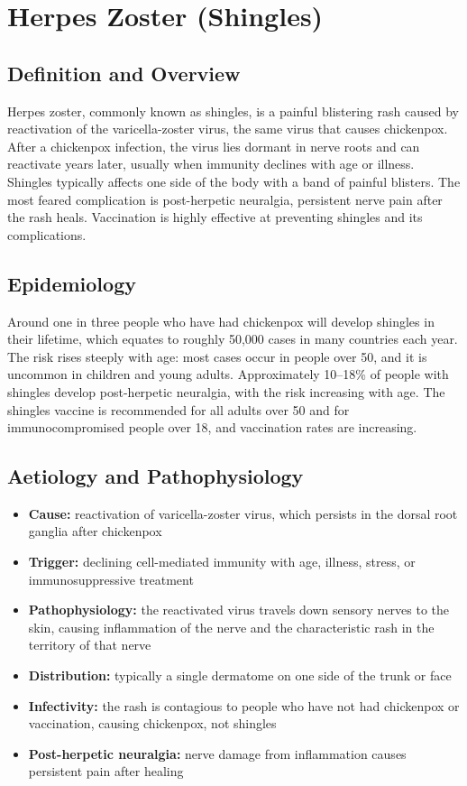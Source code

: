 \chapter{Herpes Zoster (Shingles)}

\section*{Definition and Overview}
Herpes zoster, commonly known as shingles, is a painful blistering rash caused by reactivation of the varicella-zoster virus, the same virus that causes chickenpox. After a chickenpox infection, the virus lies dormant in nerve roots and can reactivate years later, usually when immunity declines with age or illness. Shingles typically affects one side of the body with a band of painful blisters. The most feared complication is post-herpetic neuralgia, persistent nerve pain after the rash heals. Vaccination is highly effective at preventing shingles and its complications.

\section*{Epidemiology}
Around one in three people who have had chickenpox will develop shingles in their lifetime, which equates to roughly 50,000 cases in many countries each year. The risk rises steeply with age: most cases occur in people over 50, and it is uncommon in children and young adults. Approximately 10--18\% of people with shingles develop post-herpetic neuralgia, with the risk increasing with age. The shingles vaccine is recommended for all adults over 50 and for immunocompromised people over 18, and vaccination rates are increasing.

\section*{Aetiology and Pathophysiology}
\begin{itemize}
    \item \textbf{Cause:} reactivation of varicella-zoster virus, which persists in the dorsal root ganglia after chickenpox
    \item \textbf{Trigger:} declining cell-mediated immunity with age, illness, stress, or immunosuppressive treatment
    \item \textbf{Pathophysiology:} the reactivated virus travels down sensory nerves to the skin, causing inflammation of the nerve and the characteristic rash in the territory of that nerve
    \item \textbf{Distribution:} typically a single dermatome on one side of the trunk or face
    \item \textbf{Infectivity:} the rash is contagious to people who have not had chickenpox or vaccination, causing chickenpox, not shingles
    \item \textbf{Post-herpetic neuralgia:} nerve damage from inflammation causes persistent pain after healing
\end{itemize}

